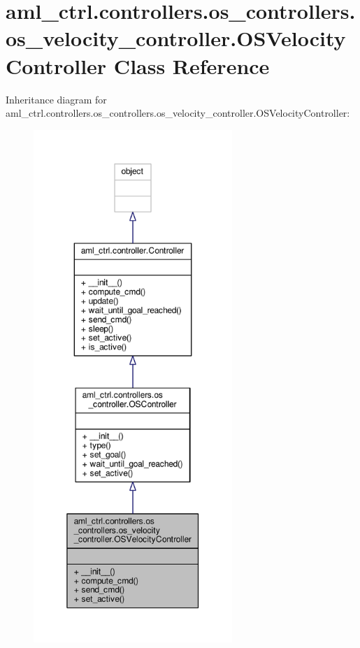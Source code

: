 \hypertarget{classaml__ctrl_1_1controllers_1_1os__controllers_1_1os__velocity__controller_1_1_o_s_velocity_controller}{\section{aml\-\_\-ctrl.\-controllers.\-os\-\_\-controllers.\-os\-\_\-velocity\-\_\-controller.\-O\-S\-Velocity\-Controller Class Reference}
\label{classaml__ctrl_1_1controllers_1_1os__controllers_1_1os__velocity__controller_1_1_o_s_velocity_controller}
}


Inheritance diagram for aml\-\_\-ctrl.\-controllers.\-os\-\_\-controllers.\-os\-\_\-velocity\-\_\-controller.\-O\-S\-Velocity\-Controller\-:
\nopagebreak
\begin{figure}[H]
\begin{center}
\leavevmode
\includegraphics[height=550pt]{classaml__ctrl_1_1controllers_1_1os__controllers_1_1os__velocity__controller_1_1_o_s_velocity_controller__inherit__graph}
\end{center}
\end{figure}


